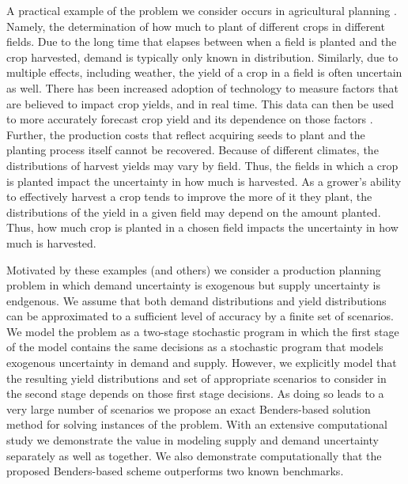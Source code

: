 \documentclass[12pt]{article}
\theoremstyle{thmstylethree}%
\begin{document}
A practical example of the problem we consider occurs in agricultural planning \cite{jones2001matching,jones2003managing,ahumada2009application,syngenta_cover}. Namely, the determination of how much to plant of different crops in different fields. Due to the long time that elapses between when a field is planted and the crop harvested, demand is typically only known in distribution. Similarly, due to multiple effects, including weather, the yield of a crop in a field is often uncertain as well. There has been increased adoption \cite{9167626,8643194,9718402} of technology to measure factors that are believed to impact crop yields, and in real time. This data can then be used to more accurately forecast crop yield and its dependence on those factors \cite{JIN2018141}.  Further, the production costs that reflect acquiring seeds to plant and the planting process itself cannot be recovered. Because of different climates, the distributions of harvest yields may vary by field. Thus, the fields in which a crop is planted impact the uncertainty in how much is harvested.  As a grower's ability to effectively harvest a crop tends to improve the more of it they plant, the distributions of the yield in a given field may depend on the amount planted.  Thus, how much crop is planted in a chosen field impacts the uncertainty in how much is harvested. 
 

Motivated by these examples (and others) we consider a production planning problem in which demand uncertainty is exogenous but supply uncertainty is endgenous.
We  assume that both demand distributions and yield distributions can be approximated to a sufficient level of accuracy by a finite set of scenarios.
We model the problem as a two-stage stochastic program in which the first stage of the model contains the same decisions as a stochastic program that models exogenous uncertainty in demand and supply.
However, we explicitly model that the resulting yield distributions and set of appropriate scenarios to consider in the second stage depends on those first stage decisions.
As doing so leads to a very large number of scenarios we propose an exact Benders-based solution method for solving instances of the problem.
With an extensive computational study we demonstrate the value in modeling supply and demand uncertainty separately as well as together.
We also demonstrate computationally that the proposed Benders-based scheme outperforms two known benchmarks. 
\end{document}
